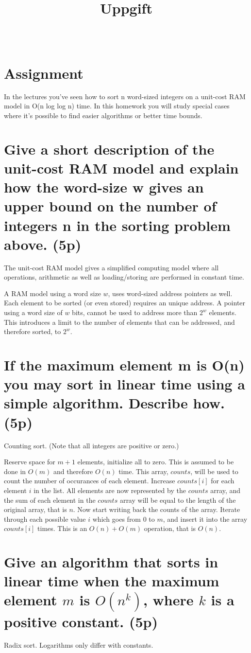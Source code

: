 \documentclass[a4paper,10pt,titlepage]{article}
\title{\courseName\\\vspace{4pt}Uppgift \assignmentNumber}
\date{\writtenDate}
\author{\myName\\\emph{\myEmail}}
\begin{document}
\maketitle

\section*{Assignment}
In the lectures you've seen how to sort n word-sized integers on a unit-cost RAM model in O(n log log n) time. In this homework you will study special cases where it's possible to find easier algorithms or better time bounds. 


\section{Give a short description of the unit-cost RAM model and explain how the word-size w gives an upper bound on the number of integers n in the sorting problem above. (5p)}

The unit-cost RAM model gives a simplified computing model where all operations, arithmetic as well as loading/storing are performed in constant time.

A RAM model using a word size $w$, uses word-sized address pointers as well. Each element to be sorted (or even stored) requires an unique address. A pointer using a word size of $w$ bits, cannot be used to address more than $2^w$ elements. This introduces a limit to the number of elements that can be addressed, and therefore sorted, to $2^w$.


\section {If the maximum element m is O(n) you may sort in linear time using a simple algorithm. Describe how. (5p) }

Counting sort. (Note that all integers are positive or zero.)

Reserve space for $m+1$ elements, initialize all to zero. This is assumed to be done in $O(m)$ and therefore $O(n)$ time. This array, $counts$, will be used to count the number of occurances of each element. Increase $counts[i]$ for each element $i$ in the list. All elements are now represented by the $counts$ array, and the sum of each element in the $counts$ array will be equal to the length of the original array, that is $n$. Now start writing back the counts of the array. Iterate through each possible value $i$ which goes from $0$ to $m$, and insert it into the array $counts[i]$ times. This is an $O(n) + O(m)$ operation, that is $O(n)$.

\section {Give an algorithm that sorts in linear time when the maximum element $m$ is $O(n^k)$, where $k$ is a positive constant. (5p)}

Radix sort. Logarithms only differ with constants.
\end{document}

